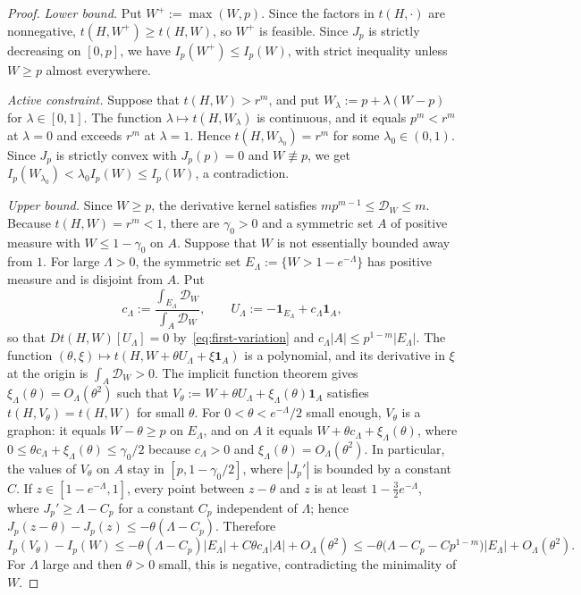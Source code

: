 \begin{proof}
\emph{Lower bound.}  Put $W^+:=\max(W,p)$.  Since the factors in $t(H,\cdot)$ are
nonnegative, $t(H,W^+)\ge t(H,W)$, so $W^+$ is feasible.  Since $J_p$ is strictly
decreasing on $[0,p]$, we have $I_p(W^+)\le I_p(W)$, with strict inequality
unless $W\ge p$ almost everywhere.

\emph{Active constraint.}  Suppose that $t(H,W)>r^m$, and put
$W_\lambda:=p+\lambda(W-p)$ for $\lambda\in[0,1]$.  The function
$\lambda\mapsto t(H,W_\lambda)$ is continuous, and it equals $p^m<r^m$ at
$\lambda=0$ and exceeds $r^m$ at $\lambda=1$.  Hence $t(H,W_{\lambda_0})=r^m$
for some $\lambda_0\in(0,1)$.  Since $J_p$ is strictly convex with $J_p(p)=0$
and $W\not\equiv p$, we get $I_p(W_{\lambda_0})<\lambda_0I_p(W)\le I_p(W)$, a
contradiction.

\emph{Upper bound.}  Since $W\ge p$, the derivative kernel satisfies
$mp^{m-1}\le\mathcal D_W\le m$.  Because $t(H,W)=r^m<1$, there are $\gamma_0>0$
and a symmetric set $A$ of positive measure with $W\le1-\gamma_0$ on $A$.
Suppose that $W$ is not essentially bounded away from $1$.  For large
$\Lambda>0$, the symmetric set $E_\Lambda:=\{W>1-e^{-\Lambda}\}$ has positive
measure and is disjoint from $A$.  Put
\[
  c_\Lambda:=\frac{\int_{E_\Lambda}\mathcal D_W}{\int_A\mathcal D_W},
  \qquad
  U_\Lambda:=-\mathbf 1_{E_\Lambda}+c_\Lambda\mathbf 1_A,
\]
so that $Dt(H,W)[U_\Lambda]=0$ by~\eqref{eq:first-variation} and
$c_\Lambda|A|\le p^{1-m}|E_\Lambda|$.  The function
$(\theta,\xi)\mapsto t(H,W+\theta U_\Lambda+\xi\mathbf 1_A)$ is a polynomial, and
its derivative in $\xi$ at the origin is $\int_A\mathcal D_W>0$.  The implicit
function theorem gives $\xi_\Lambda(\theta)=O_\Lambda(\theta^2)$ such that
$V_\theta:=W+\theta U_\Lambda+\xi_\Lambda(\theta)\mathbf 1_A$ satisfies
$t(H,V_\theta)=t(H,W)$ for small $\theta$.  For $0<\theta<e^{-\Lambda}/2$ small
enough, $V_\theta$ is a graphon: it equals $W-\theta\ge p$ on $E_\Lambda$, and
on $A$ it equals $W+\theta c_\Lambda+\xi_\Lambda(\theta)$, where
$0\le\theta c_\Lambda+\xi_\Lambda(\theta)\le\gamma_0/2$ because $c_\Lambda>0$
and $\xi_\Lambda(\theta)=O_\Lambda(\theta^2)$.  In particular, the values of
$V_\theta$ on $A$ stay in $[p,1-\gamma_0/2]$, where $|J_p'|$ is bounded by a
constant $C$.  If $z\in[1-e^{-\Lambda},1]$, every point between $z-\theta$ and
$z$ is at least $1-\frac32e^{-\Lambda}$, where $J_p'\ge\Lambda-C_p$ for a
constant $C_p$ independent of $\Lambda$; hence
$J_p(z-\theta)-J_p(z)\le-\theta(\Lambda-C_p)$.  Therefore
\[
  I_p(V_\theta)-I_p(W)
  \le-\theta(\Lambda-C_p)|E_\Lambda|+C\theta c_\Lambda|A|+O_\Lambda(\theta^2)
  \le-\theta\bigl(\Lambda-C_p-Cp^{1-m}\bigr)|E_\Lambda|+O_\Lambda(\theta^2).
\]
For $\Lambda$ large and then $\theta>0$ small, this is negative, contradicting
the minimality of $W$.
\end{proof}

